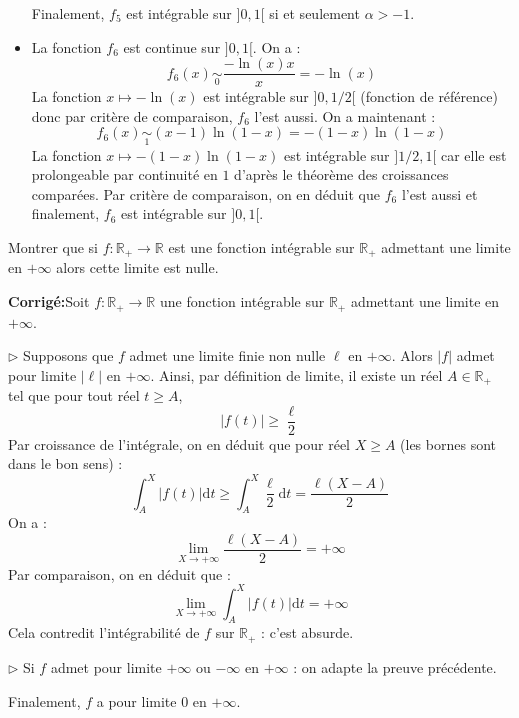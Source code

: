 \documentclass[a4paper,twoside,french,10pt]{VcCours}
\newcommand{\dt}{\text{d}t}
\newcommand{\corr}{\textbf{Corrigé:}}
\begin{document}
\begin{itemize}
\medskip

\noindent Finalement, $f_5$ est intégrable sur $]0,1[$ si et seulement $\alpha>-1$.
 \item La fonction $f_6$ est continue sur $]0,1[$. On a :
 $$f_6(x) \underset{0}{\sim} \dfrac{- \ln(x) x}{x} = - \ln(x)$$
 La fonction $x \mapsto - \ln(x)$ est intégrable sur $]0,1/2[$ (fonction de référence) donc par critère de comparaison, $f_6$ l'est aussi. On a maintenant :
 $$ f_6(x) \underset{1}{\sim} (x-1) \ln(1-x) = - (1-x)\ln(1-x)$$
 La fonction $x \mapsto -(1-x)\ln(1-x)$ est intégrable sur $]1/2,1[$ car elle est prolongeable par continuité en $1$ d'après le théorème des croissances comparées. Par critère de comparaison, on en déduit que $f_6$ l'est aussi et finalement, $f_6$ est intégrable sur $]0,1[$.
\end{itemize}

\begin{Exercice}{} Montrer que si $f : \mathbb{R}_+ \rightarrow \mathbb{R}$ est une fonction intégrable sur $\mathbb{R}_+$ admettant une limite en $+ \infty$ alors cette limite est nulle. 
\end{Exercice} 

\corr Soit $f : \mathbb{R}_+ \rightarrow \mathbb{R}$ une fonction intégrable sur $\mathbb{R}_+$ admettant une limite en $+ \infty$. 

\medskip

\noindent $\rhd$ Supposons que $f$ admet une limite finie non nulle $\ell$ en $+ \infty$. Alors $\vert f \vert $ admet pour limite $\vert \ell \vert$ en $+ \infty$. Ainsi, par définition de limite, il existe un réel $A \in \mathbb{R}_+$ tel que pour tout réel $t \geq A$,
$$ \vert f(t) \vert \geq \dfrac{\ell}{2}$$
Par croissance de l'intégrale, on en déduit que pour réel $X \geq A$ (les bornes sont dans le bon sens) : 
$$ \int_A^{X} \vert f(t) \vert \dt \geq \int_A^{X} \dfrac{\ell}{2} \dt = \dfrac{\ell(X-A)}{2}$$
On a :
$$ \lim_{X \rightarrow + \infty} \dfrac{\ell(X-A)}{2} = + \infty$$
Par comparaison, on en déduit que :
$$  \lim_{X \rightarrow + \infty} \int_A^{X} \vert f(t) \vert \dt = + \infty$$
Cela contredit l'intégrabilité de $f$ sur $\mathbb{R}_+$ : c'est absurde.

\medskip

\noindent $\rhd$ Si $f$ admet pour limite $+ \infty$ ou $-\infty$ en $+ \infty$ : on adapte la preuve précédente.

\medskip

\noindent Finalement, $f$ a pour limite $0$ en $+ \infty$.
\end{document}
